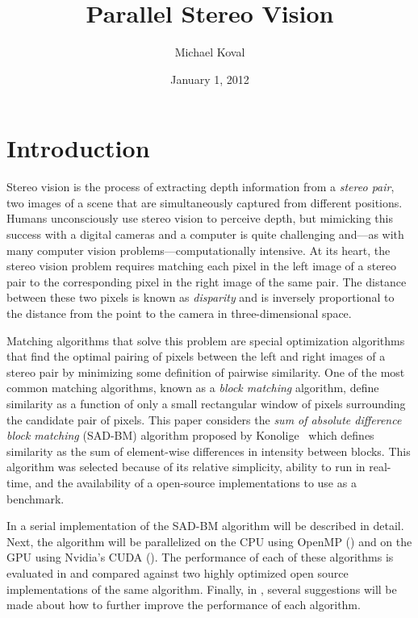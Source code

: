 \documentclass{article}
\title{Parallel Stereo Vision}
\author{Michael Koval}
\date{January 1, 2012}
\begin{document}
\maketitle

\section{Introduction}
\label{sec:intro}
Stereo vision is the process of extracting depth information from a
\textit{stereo pair}, two images of a scene that are simultaneously captured
from different positions. Humans unconsciously use stereo vision to perceive
depth, but mimicking this success with a digital cameras and a computer is
quite challenging and---as with many computer vision problems---computationally
intensive. At its heart, the stereo vision problem requires matching each pixel
in the left image of a stereo pair to the corresponding pixel in the right
image of the same pair. The distance between these two pixels is known as
\textit{disparity} and is inversely proportional to the distance from the point
to the camera in three-dimensional space.

Matching algorithms that solve this problem are special optimization algorithms
that find the optimal pairing of pixels between the left and right images of a
stereo pair by minimizing some definition of pairwise similarity. One of the
most common matching algorithms, known as a \textit{block matching} algorithm,
define similarity as a function of only a small rectangular window of pixels
surrounding the candidate pair of pixels. This paper considers the \textit{sum
of absolute difference block matching} (SAD-BM) algorithm proposed by
Konolige~\cite{konolige97} which defines similarity as the sum of element-wise
differences in intensity between blocks. This algorithm was selected because of
its relative simplicity, ability to run in real-time, and the availability of a
open-source implementations to use as a benchmark.

In  a serial implementation of the SAD-BM algorithm will be
described in detail. Next, the algorithm will be parallelized on the CPU using
OpenMP () and on the GPU using Nvidia's CUDA
(). The performance of each of these algorithms is
evaluated in  and compared against two highly optimized open
source implementations of the same algorithm. Finally, in ,
several suggestions will be made about how to further improve the performance
of each algorithm.
\end{document}

